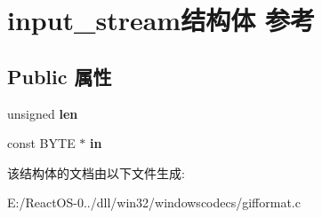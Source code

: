 \hypertarget{structinput__stream}{}\section{input\+\_\+stream结构体 参考}
\label{structinput__stream}
\subsection*{Public 属性}
\begin{DoxyCompactItemize}
\item 
\mbox{\label{structinput__stream_ac6dd0e9e60e6f3f6b7ff50ec28e8ec1c}} 
unsigned {\bfseries len}
\item 
\mbox{\label{structinput__stream_a3159b798c0236d0d984b238beab4fd00}} 
const B\+Y\+TE $\ast$ {\bfseries in}
\end{DoxyCompactItemize}


该结构体的文档由以下文件生成\+:\begin{DoxyCompactItemize}
\item 
E\+:/\+React\+O\+S-\/0../dll/win32/windowscodecs/gifformat.\+c\end{DoxyCompactItemize}
